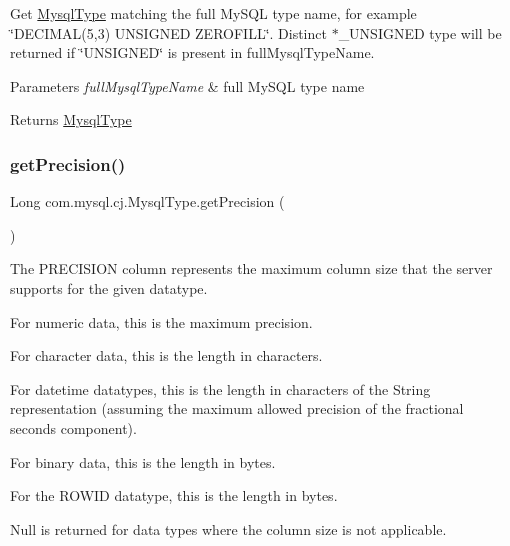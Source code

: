 Get \mbox{\hyperlink{enumcom_1_1mysql_1_1cj_1_1_mysql_type}{Mysql\+Type}} matching the full My\+S\+QL type name, for example \char`\"{}\+D\+E\+C\+I\+M\+A\+L(5,3) U\+N\+S\+I\+G\+N\+E\+D Z\+E\+R\+O\+F\+I\+L\+L\char`\"{}. Distinct $\ast$\+\_\+\+U\+N\+S\+I\+G\+N\+ED type will be returned if \char`\"{}\+U\+N\+S\+I\+G\+N\+E\+D\char`\"{} is present in full\+Mysql\+Type\+Name.


\begin{DoxyParams}{Parameters}
{\em full\+Mysql\+Type\+Name} & full My\+S\+QL type name \\
\hline
\end{DoxyParams}
\begin{DoxyReturn}{Returns}
\mbox{\hyperlink{enumcom_1_1mysql_1_1cj_1_1_mysql_type}{Mysql\+Type}} 
\end{DoxyReturn}
\mbox{\label{enumcom_1_1mysql_1_1cj_1_1_mysql_type_ab636a1d0c77d0dc3e7daf32889cc2abe}} 
\subsubsection{\texorpdfstring{get\+Precision()}{getPrecision()}}
{\footnotesize\ttfamily Long com.\+mysql.\+cj.\+Mysql\+Type.\+get\+Precision (\begin{DoxyParamCaption}{ }\end{DoxyParamCaption})}

The P\+R\+E\+C\+I\+S\+I\+ON column represents the maximum column size that the server supports for the given datatype. 
\begin{DoxyItemize}
\item For numeric data, this is the maximum precision. 
\item For character data, this is the length in characters. 
\item For datetime datatypes, this is the length in characters of the String representation (assuming the maximum allowed precision of the fractional seconds component). 
\item For binary data, this is the length in bytes. 
\item For the R\+O\+W\+ID datatype, this is the length in bytes. 
\item Null is returned for data types where the column size is not applicable. 
\end{DoxyItemize}

